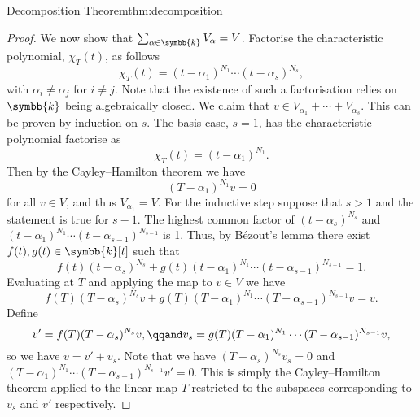 \documentclass[fleqn]{NotesClass}
\renewcommand{\field}{\symbb{k}}
\begin{document}
\begin{thm}{Decomposition Theorem}{thm:decomposition}
\begin{proof}
            We now show that \(\sum_{\alpha \in \field} V_\alpha = V\).
            Factorise the characteristic polynomial, \(\chi_T(t)\), as follows
            \begin{equation}
                \chi_T(t) = (t - \alpha_1)^{N_1} \dotsm (t - \alpha_s)^{N_s},
            \end{equation}
            with \(\alpha_i \ne \alpha_j\) for \(i \ne j\).
            Note that the existence of such a factorisation relies on \(\field\) being algebraically closed.
            We claim that \(v \in V_{\alpha_1} + \dotsb + V_{\alpha_s}\).
            This can be proven by induction on \(s\).
            The basis case, \(s = 1\), has the characteristic polynomial factorise as
            \begin{equation}
                \chi_T(t) = (t - \alpha_1)^{N_1}.
            \end{equation}
            Then by the Cayley--Hamilton theorem we have
            \begin{equation}
                (T - \alpha_1)^{N_1}v = 0
            \end{equation}
            for all \(v \in V\), and thus \(V_{\alpha_1} = V\).
            For the inductive step suppose that \(s > 1\) and the statement is true for \(s - 1\).
            The highest common factor of \((t - \alpha_s)^{N_s}\) and \((t - \alpha_1)^{N_1} \dotsm (t - \alpha_{s-1})^{N_{s-1}}\) is 1.
            Thus, by B\'ezout's lemma there exist \(f(t), g(t) \in \field[t]\) such that
            \begin{equation}
                f(t)(t - \alpha_s)^{N_s} + g(t)(t - \alpha_1)^{N_1} \dotsm (t - \alpha_{s-1})^{N_{s-1}} = 1.
            \end{equation}
            Evaluating at \(T\) and applying the map to \(v \in V\) we have
            \begin{equation}
                f(T)(T - \alpha_s)^{N_s}v + g(T)(T - \alpha_1)^{N_1} \dotsm (T - \alpha_{s-1})^{N_{s-1}}v = v.
            \end{equation}
            Define
            \begin{equation}
                v' = f(T)(T - \alpha_s)^{N_s}v, \qqand v_s = g(T)(T - \alpha_1)^{N_1} \dotsm (T - \alpha_{s-1})^{N_{s-1}}v,
            \end{equation}
            so we have \(v = v' + v_s\).
            Note that we have \((T - \alpha_s)^{N_s}v_s = 0\) and \((T - \alpha_1)^{N_1} \dotsm (T - \alpha_{s-1})^{N_{s-1}}v' = 0\).
            This is simply the Cayley--Hamilton theorem applied to the linear map \(T\) restricted to the subspaces corresponding to \(v_s\) and \(v'\) respectively.

\end{proof}
\end{thm}
\end{document}
